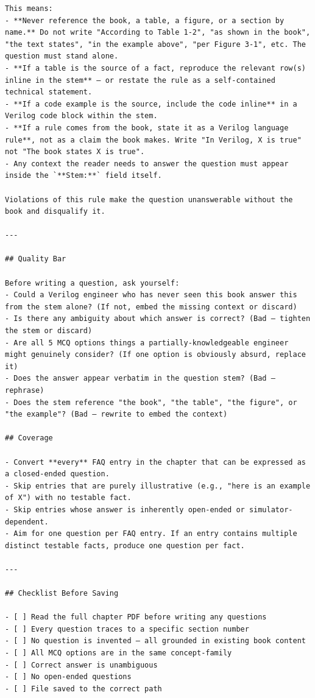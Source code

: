 \documentclass[letterpaper, 12pt]{article}
\begin{document}
\begin{appendices}
\begin{verbatim}
This means:
- **Never reference the book, a table, a figure, or a section by name.** Do not write "According to Table 1-2", "as shown in the book", "the text states", "in the example above", "per Figure 3-1", etc. The question must stand alone.
- **If a table is the source of a fact, reproduce the relevant row(s) inline in the stem** — or restate the rule as a self-contained technical statement.
- **If a code example is the source, include the code inline** in a Verilog code block within the stem.
- **If a rule comes from the book, state it as a Verilog language rule**, not as a claim the book makes. Write "In Verilog, X is true" not "The book states X is true".
- Any context the reader needs to answer the question must appear inside the `**Stem:**` field itself.

Violations of this rule make the question unanswerable without the book and disqualify it.

---

## Quality Bar

Before writing a question, ask yourself:
- Could a Verilog engineer who has never seen this book answer this from the stem alone? (If not, embed the missing context or discard)
- Is there any ambiguity about which answer is correct? (Bad — tighten the stem or discard)
- Are all 5 MCQ options things a partially-knowledgeable engineer might genuinely consider? (If one option is obviously absurd, replace it)
- Does the answer appear verbatim in the question stem? (Bad — rephrase)
- Does the stem reference "the book", "the table", "the figure", or "the example"? (Bad — rewrite to embed the context)

## Coverage

- Convert **every** FAQ entry in the chapter that can be expressed as a closed-ended question.
- Skip entries that are purely illustrative (e.g., "here is an example of X") with no testable fact.
- Skip entries whose answer is inherently open-ended or simulator-dependent.
- Aim for one question per FAQ entry. If an entry contains multiple distinct testable facts, produce one question per fact.

---

## Checklist Before Saving

- [ ] Read the full chapter PDF before writing any questions
- [ ] Every question traces to a specific section number
- [ ] No question is invented — all grounded in existing book content
- [ ] All MCQ options are in the same concept-family
- [ ] Correct answer is unambiguous
- [ ] No open-ended questions
- [ ] File saved to the correct path
\end{verbatim}

\end{appendices}
\end{document}
